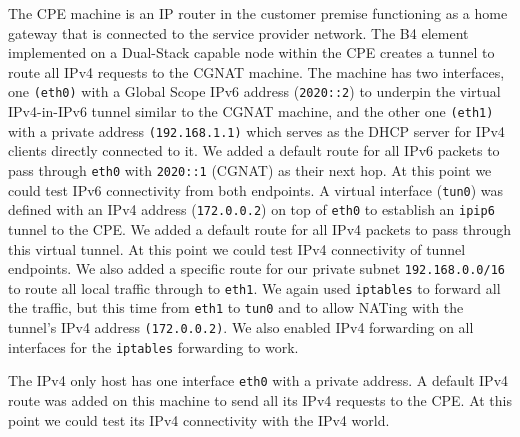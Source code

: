 \documentclass{llncs}
\begin{document}
The CPE machine is an IP router in the customer premise functioning as a home gateway that is connected to the service provider network. The B4 element \cite{DSLITE} implemented on a Dual-Stack capable node within the CPE creates a tunnel to route all IPv4 requests to the CGNAT machine. The machine has two interfaces, one \texttt{(eth0)} with a Global Scope IPv6 address (\texttt{2020::2}) to underpin the virtual IPv4-in-IPv6 tunnel similar to the CGNAT machine, and the other one \texttt{(eth1)} with a private \cite{RFC1918} address \texttt{(192.168.1.1)} which serves as the DHCP server for IPv4 clients directly connected to it. We added a default route for all IPv6 packets to pass through \texttt{eth0} with \texttt{2020::1} (CGNAT) as their next hop. At this point we could test IPv6 connectivity from both endpoints. A virtual interface (\texttt{tun0}) was defined with an IPv4 address (\texttt{172.0.0.2}) on top of \texttt{eth0} to establish an \texttt{ipip6} tunnel to the CPE. 
We added a default route for all IPv4 packets to pass through this virtual tunnel. At this point we could test IPv4 connectivity of tunnel endpoints. We also added a specific route for our private subnet \texttt{192.168.0.0/16} to route all local traffic through to \texttt{eth1}. We again used \texttt{iptables} to forward all the traffic, but this time from \texttt{eth1} to \texttt{tun0} and to allow NATing with the tunnel's IPv4 address \texttt{(172.0.0.2)}. We also enabled IPv4 forwarding on all interfaces for the \texttt{iptables} forwarding to work. 

The IPv4 only host has one interface \texttt{eth0} with a private address. A default IPv4 route was added on this machine to send all its IPv4 requests to the CPE. At this point we could test its IPv4 connectivity with the IPv4 world. 
\end{document}
